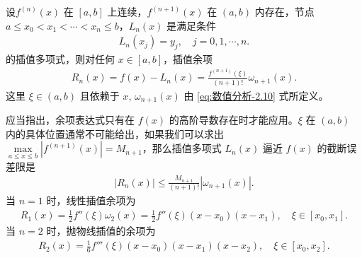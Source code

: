 \documentclass[../../main.tex]{subfiles}
\begin{document}
\begin{theorem}\label{theorem:Lagrange插值多项式的Lagrange插值余项}
设$f^{(n)}(x)$ 在 $[a, b]$ 上连续，$f^{(n + 1)}(x)$ 在 $(a, b)$ 内存在，节点 $a \leqslant x_0 < x_1 < \cdots < x_n \leqslant b$，$L_n(x)$ 是满足条件 
\begin{align*}
L_n(x_j) = y_j, \quad j = 0, 1, \cdots, n.
\end{align*}
的插值多项式，则对任何 $x \in [a, b]$，插值余项 
\begin{align}
R_n(x) = f(x) - L_n(x) = \frac{f^{(n + 1)}(\xi)}{(n + 1)!} \omega_{n + 1}(x). \label{eq:数值分析-2.12}
\end{align}
这里 $\xi \in (a, b)$ 且依赖于 $x$,$\,\,\omega_{n + 1}(x)$ 由 \eqref{eq:数值分析-2.10} 式所定义。
\end{theorem}
\begin{remark}
应当指出，余项表达式只有在 $f(x)$ 的高阶导数存在时才能应用。$\xi$ 在 $(a, b)$ 内的具体位置通常不可能给出，如果我们可以求出 $\max\limits_{a \leqslant x \leqslant b} | f^{(n + 1)}(x) | = M_{n + 1}$，那么插值多项式 $L_n(x)$ 逼近 $f(x)$ 的截断误差限是
\begin{align}
| R_n(x) | \leqslant \frac{M_{n + 1}}{(n + 1)!} | \omega_{n + 1}(x) | .\label{eq:数值分析-2.14}
\end{align}
当 $n = 1$ 时，线性插值余项为 
\begin{align}
R_1(x) = \frac{1}{2} f''(\xi) \omega_2(x) = \frac{1}{2} f''(\xi)(x - x_0)(x - x_1), \quad \xi \in [x_0, x_1] .\label{eq:数值分析-2.15}
\end{align}
当 $n = 2$ 时，抛物线插值的余项为 
\begin{align}
R_2(x) = \frac{1}{6} f'''(\xi)(x - x_0)(x - x_1)(x - x_2), \quad \xi \in [x_0, x_2].\label{eq:数值分析-2.16}
\end{align}
\end{remark}
\end{document}
